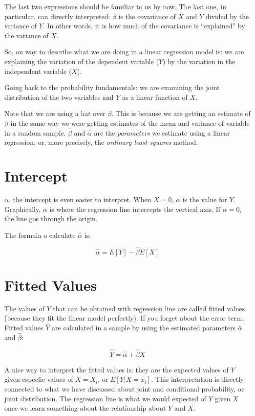 \documentclass[11pt]{article}
\begin{document}
The last two expressions should be familiar to us by now. The last one, in particular, can directly interpreted: $\beta$ is the covariance of $X$ and $Y$ divided by the variance of $Y$. In other words, it is how much of the covariance is ``explained'' by the variance of $X$.

So, on way to describe what we are doing in a linear regression model is: we are explaining the variation of the dependent variable ($Y$) by the variation in the independent variable ($X$).

Going back to the probability fundamentals: we are examining the joint distribution of the two variables and $Y$ as a linear function of $X$.

Note that we are using a hat over $\beta$. This is because we are getting an estimate of $\beta$ in the same way we were getting estimates of the mean and variance of variable in a random sample. $\hat\beta$ and $\hat\alpha$ are the \emph{parameters} we estimate using a linear regression, or, more precisely, the \emph{ordinary least squares} method.

\section*{Intercept}

$\alpha$, the intercept is even easier to interpret. When $X = 0$, $\alpha$ is the value for $Y$. Graphically, $\alpha$ is where the regression line intercepts the vertical axis. If $\alpha = 0$, the line gos through the origin.

The formula o calculate $\hat\alpha$ is:

\[\hat\alpha = E[Y] - \hat\beta E[X]\]

\section*{Fitted Values}

The values of $Y$ that can be obtained with regression line are called fitted values (because they fit the linear model perfectly). If you forget about the error term, Fitted values $\hat{Y}$ are calculated in a sample by using the estimated parameters $\hat\alpha$ and $\hat\beta$:

\[\hat{Y} = \hat\alpha + \hat\beta X\]

A nice way to interpret the fitted values is: they are the expected values of $Y$ given especfic values of $X = X_i$, or $E[Y|X = x_i]$. This interpretation is directly connected to what we have discussed about joint and conditional probability, or joint distribution. The regression line is what we would expected of $Y$ given $X$ once we learn something about the relationship about $Y$ and $X$.
\end{document}
